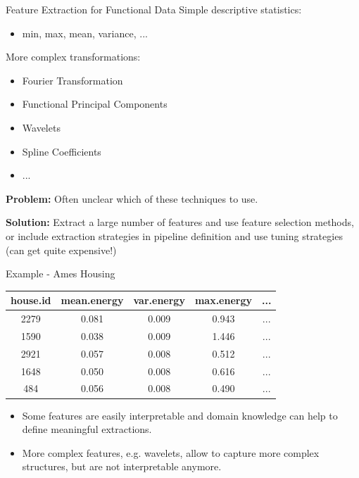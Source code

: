 \begin{vbframe}{Feature Extraction for Functional Data}
    Simple descriptive statistics:
    \begin{itemize}
        \item min, max, mean, variance, ...
    \end{itemize}
    \vspace{+.4cm}
    
    More complex transformations:
    \begin{itemize}
        \item Fourier Transformation
        \item Functional Principal Components
        \item Wavelets
        \item Spline Coefficients
        \item ...
    \end{itemize}
    
    \textbf{Problem:} Often unclear which of these techniques to use.
    
    \vspace{+.2cm}
    
    \textbf{Solution:} Extract a large number of features and use feature selection methods, or include extraction strategies in pipeline definition and use tuning strategies (can get quite expensive!)
\end{vbframe}

\begin{vbframe}{Example - Ames Housing}
    
    
    \footnotesize
    \begin{center}
        \begin{tabular}{c|c|c|c|c}
            \hline
            house.id & mean.energy & var.energy & max.energy & ... \\
            \hline
            2279     & 0.081       & 0.009      & 0.943      & ... \\
            \hline
            1590     & 0.038       & 0.009      & 1.446      & ... \\
            \hline
            2921     & 0.057       & 0.008      & 0.512      & ... \\
            \hline
            1648     & 0.050       & 0.008      & 0.616      & ... \\
            \hline
            484      & 0.056       & 0.008      & 0.490      & ... \\
            \hline
        \end{tabular}
    \end{center}
    
    
    \normalsize
    \vspace{+.4cm}
    \begin{itemize}
        \item Some features are easily interpretable and domain knowledge can help to define meaningful extractions.
        \item More complex features, e.g. wavelets, allow to capture more complex structures, but are not interpretable anymore.
    \end{itemize}
\end{vbframe}

